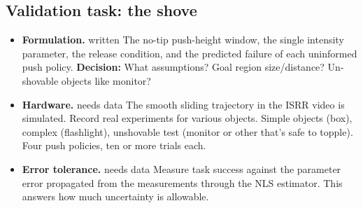 \documentclass[10pt, conference]{IEEEtran}
\newcommand{\decision}[1]{\textcolor{red!80!black}{\textbf{Decision:} #1}}
\newcommand{\dat}{\textcolor{orange!85!black}{\small needs data}}
\begin{document}
\subsection{Validation task: the shove}

\begin{itemize}[leftmargin=*, itemsep=2pt]
  \item \textbf{Formulation.} \textcolor{green!50!black}{\small written} The no-tip push-height window, the single intensity parameter, the release condition, and the predicted failure of each uninformed push policy. \decision{What assumptions? Goal region size/distance? Un-shovable objects like monitor?}
  \item \textbf{Hardware.} \dat{} The smooth sliding trajectory in the ISRR video is simulated. Record real experiments for various objects. Simple objects (box), complex (flashlight), unshovable test (monitor or other that's safe to topple). Four push policies, ten or more trials each.
  \item \textbf{Error tolerance.} \dat{} Measure task success against the parameter error propagated from the measurements through the NLS estimator. This answers how much uncertainty is allowable.
\end{itemize}

\end{document}
